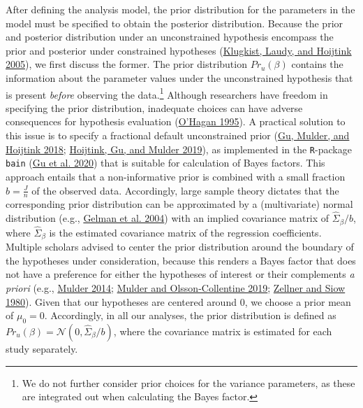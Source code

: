 \documentclass[
  11pt,
]{article}
\begin{document}
After defining the analysis model, the prior distribution for the parameters in the model must be specified to obtain the posterior distribution.
Because the prior and posterior distribution under an unconstrained hypothesis encompass the prior and posterior under constrained hypotheses (\protect\hyperlink{ref-klugkist_inequality_2005}{Klugkist, Laudy, and Hoijtink 2005}), we first discuss the former.
The prior distribution \(Pr_u(\beta)\) contains the information about the parameter values under the unconstrained hypothesis that is present \emph{before} observing the data.\footnote{We do not further consider prior choices for the variance parameters, as these are integrated out when calculating the Bayes factor.}
Although researchers have freedom in specifying the prior distribution, inadequate choices can have adverse consequences for hypothesis evaluation (\protect\hyperlink{ref-ohagan_fractional_1995}{O'Hagan 1995}).
A practical solution to this issue is to specify a fractional default unconstrained prior (\protect\hyperlink{ref-gu_approximated_2018}{Gu, Mulder, and Hoijtink 2018}; \protect\hyperlink{ref-hoijtink_gu_mulder_2019}{Hoijtink, Gu, and Mulder 2019}), as implemented in the \texttt{R}-package \texttt{bain} (\protect\hyperlink{ref-bain}{Gu et al. 2020}) that is suitable for calculation of Bayes factors.
This approach entails that a non-informative prior is combined with a small fraction \(b = \frac{J}{n}\) of the observed data.
Accordingly, large sample theory dictates that the corresponding prior distribution can be approximated by a (multivariate) normal distribution (e.g., \protect\hyperlink{ref-bda2013}{Gelman et al. 2004}) with an implied covariance matrix of \(\hat{\Sigma}_\beta/b\), where \(\hat{\Sigma}_\beta\) is the estimated covariance matrix of the regression coefficients.
Multiple scholars advised to center the prior distribution around the boundary of the hypotheses under consideration, because this renders a Bayes factor that does not have a preference for either the hypotheses of interest or their complements \emph{a priori} (e.g., \protect\hyperlink{ref-mulder_prior_2014}{Mulder 2014}; \protect\hyperlink{ref-mulder_olssoncollentine_2019}{Mulder and Olsson-Collentine 2019}; \protect\hyperlink{ref-zellner_siow_1980}{Zellner and Siow 1980}).
Given that our hypotheses are centered around 0, we choose a prior mean of \(\mu_0 = 0\).
Accordingly, in all our analyses, the prior distribution is defined as \(Pr_u(\beta) = \mathcal{N}(0, \hat{\Sigma}_{\beta}/b)\), where the covariance matrix is estimated for each study separately.
\end{document}
